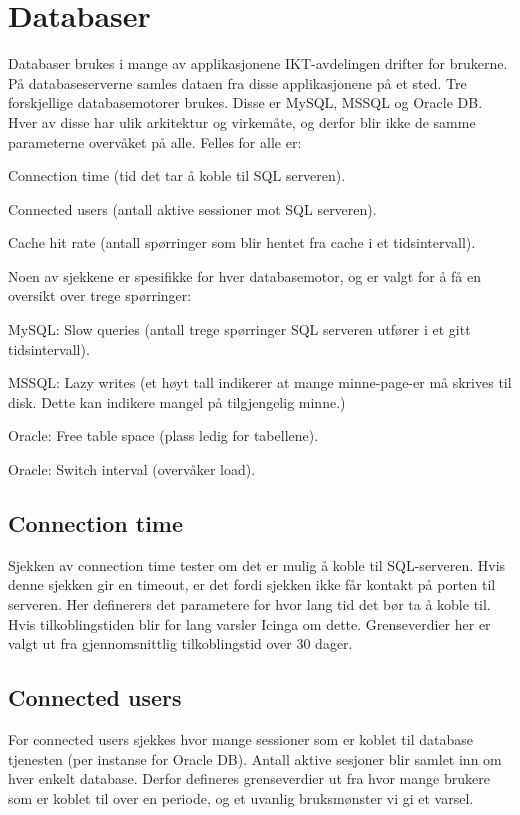 \section{Databaser}
Databaser brukes i mange av applikasjonene IKT-avdelingen drifter for brukerne. På databaseserverne samles dataen fra disse applikasjonene på et sted. 
Tre forskjellige databasemotorer brukes. Disse er MySQL, MSSQL og Oracle DB. Hver av disse har ulik arkitektur og virkemåte\cite{databasecomparison}, og derfor blir ikke de samme parameterne overvåket på alle. Felles for alle er:
\begin{itemize*}
	\item Connection time (tid det tar å koble til SQL serveren).
	\item Connected users (antall aktive sessioner mot SQL serveren).
	\item Cache hit rate (antall spørringer som blir hentet fra cache i et tidsintervall).
\end{itemize*}

Noen av sjekkene er spesifikke for hver databasemotor, og er valgt for å få en oversikt over trege spørringer:
\begin{itemize*}
\item MySQL: Slow queries (antall trege spørringer SQL serveren utfører i et gitt tidsintervall).
\item MSSQL: Lazy writes (et høyt tall indikerer at mange minne-page-er må skrives til disk. Dette kan indikere mangel på tilgjengelig minne.)
\item Oracle: Free table space (plass ledig for tabellene).
\item Oracle: Switch interval (overvåker load).
\end{itemize*}

\subsection*{Connection time}
Sjekken av connection time tester om det er mulig å koble til SQL-serveren. Hvis denne sjekken gir en timeout, er det fordi sjekken ikke får kontakt på porten til serveren. Her definerers det parametere for hvor lang tid det bør ta å koble til. Hvis tilkoblingstiden blir for lang varsler Icinga om dette. Grenseverdier her er valgt ut fra gjennomsnittlig tilkoblingstid over 30 dager.

\subsection*{Connected users}
For connected users sjekkes hvor mange sessioner som er koblet til database tjenesten (per instanse for Oracle DB). Antall aktive sesjoner blir samlet inn om hver enkelt database. Derfor defineres grenseverdier ut fra hvor mange brukere som er koblet til over en periode, og et uvanlig bruksmønster vi gi et varsel.

